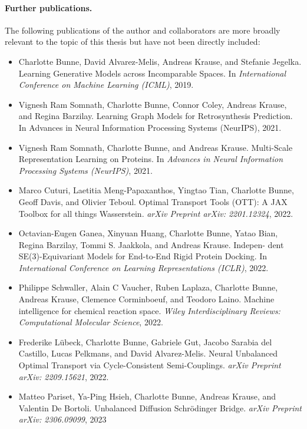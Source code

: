 \paragraph{Further publications.}
The following publications of the author and collaborators are more broadly relevant to the topic of this thesis but have not been directly included:

\begin{itemize}
	\item[] Charlotte Bunne, David Alvarez-Melis, Andreas Krause, and Stefanie Jegelka. Learning Generative Models across Incomparable Spaces. In \textit{International Conference on Machine Learning (ICML)}, 2019.
	\item[] Vignesh Ram Somnath, Charlotte Bunne, Connor Coley, Andreas Krause, and Regina Barzilay. Learning Graph Models for Retrosynthesis Prediction. In Advances in Neural Information Processing Systems (NeurIPS), 2021.
	\item[] Vignesh Ram Somnath, Charlotte Bunne, and Andreas Krause. Multi-Scale Representation Learning on Proteins. In \textit{Advances in Neural Information Processing Systems (NeurIPS)}, 2021.
	\item[] Marco Cuturi, Laetitia Meng-Papaxanthos, Yingtao Tian, Charlotte Bunne, Geoff Davis, and Olivier Teboul. Optimal Transport Tools (OTT): A JAX Toolbox for all things Wasserstein. \textit{arXiv Preprint arXiv: 2201.12324}, 2022.
	\item[] Octavian-Eugen Ganea, Xinyuan Huang, Charlotte Bunne, Yatao Bian, Regina Barzilay, Tommi S. Jaakkola, and Andreas Krause. Indepen- dent SE(3)-Equivariant Models for End-to-End Rigid Protein Docking. In \textit{International Conference on Learning Representations (ICLR)}, 2022.
	\item[] Philippe Schwaller, Alain C Vaucher, Ruben Laplaza, Charlotte Bunne, Andreas Krause, Clemence Corminboeuf, and Teodoro Laino. Machine intelligence for chemical reaction space. \textit{Wiley Interdisciplinary Reviews: Computational Molecular Science}, 2022.
	\item[] Frederike L\"ubeck, Charlotte Bunne, Gabriele Gut, Jacobo Sarabia del Castillo, Lucas Pelkmans, and David Alvarez-Melis. Neural Unbalanced Optimal Transport via Cycle-Consistent Semi-Couplings. \textit{arXiv Preprint arXiv: 2209.15621}, 2022.
	\item[] Matteo Pariset, Ya-Ping Hsieh, Charlotte Bunne, Andreas Krause, and Valentin De Bortoli. Unbalanced Diffusion Schr{\"o}dinger Bridge. \textit{arXiv Preprint arXiv: 2306.09099}, 2023
\end{itemize}

